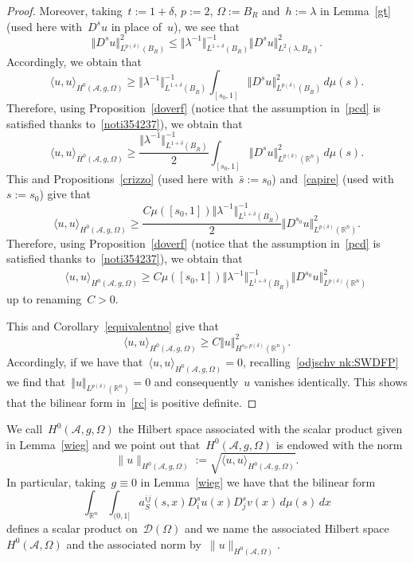 \documentclass[11pt,hyp,]{nyjm}
\numberwithin{equation}{section}
\newcommand{\R}{\mathbb{R}}
\theoremstyle{remark}
\renewcommand{\le}{\leqslant}
\renewcommand{\geq}{\geqslant}
\renewcommand{\ge}{\geqslant}
\begin{document}
\begin{proof}
Moreover, taking~$t:= 1+\delta$, $p:=2$, $\Omega:=B_R$ and~$h:=\lambda$ 
in Lemma~\ref{gt} (used here with~$D^s u $ in place of~$u$), we see that
\begin{equation}\label{pot}
 \Vert D^s u \Vert^2_{L^{p(\delta)}(B_R)}\le \Vert \lambda^{-1}\Vert^{-1}_{L^{1+\delta}(B_R)} \Vert D^s u \Vert_{L^2(\lambda, B_R)}^2.
\end{equation}
Accordingly, we obtain that
$$\langle u, u \rangle_{H^{0}(\mathcal{A}, g, \Omega)}\ge
\Vert \lambda^{-1} \Vert_{L^{1+\delta}(B_{\overline R})}^{-1} \int_{[s_0,1]} \Vert D^s u \Vert^2_{L^{p(\delta)}(B_{\overline R})} \, d\mu(s).$$
Therefore, using Proposition~\ref{doverf}
(notice that the assumption in~\eqref{pcd}
is satisfied thanks to~\eqref{noti354237}), we obtain that
$$\langle u, u \rangle_{H^{0}(\mathcal{A}, g, \Omega)}\ge\frac{
\Vert \lambda^{-1} \Vert_{L^{1+\delta}(B_{\overline R})}^{-1}}2 \int_{[s_0,1]} \Vert D^s u \Vert^2_{L^{p(\delta)}(\R^n)} \, d\mu(s).$$
This and Propositions~\ref{crizzo} (used here with~$\bar s:=s_0$) and~\ref{capire} (used with~$s:=s_0$) give that
$$\langle u, u \rangle_{H^{0}(\mathcal{A}, g, \Omega)}\ge \frac{C \mu([s_0,1])
\Vert \lambda^{-1} \Vert_{L^{1+\delta}(B_{\overline R})}^{-1}}2 \Vert D^{s_0} u \Vert^2_{L^{p(\delta)}(\R^n)}.$$
Therefore, using Proposition~\ref{doverf}
(notice that the assumption in~\eqref{pcd}
is satisfied thanks to~\eqref{noti354237}), we obtain that
\begin{eqnarray*}&&
\langle u, u \rangle_{H^{0}(\mathcal{A}, g, \Omega)}\geq 
C \mu([s_0,1])
\Vert \lambda^{-1} \Vert_{L^{1+\delta}(B_{\overline R})}^{-1} 
  \Vert D^{s_0} u \Vert^2_{L^{p(\delta)}(\R^n)}  
					\end{eqnarray*}
up to renaming~$C>0$.					
					
This and Corollary~\ref{equivalentno} give that			
$$	\langle u, u \rangle_{H^{0}(\mathcal{A}, g, \Omega)}\geq C \Vert u \Vert^2_{H^{s_0, p(\delta)}(\R^n)}.	$$
Accordingly, if we have that~$\langle u, u \rangle_{H^{0}(\mathcal{A}, g, \Omega)}=0$,
recalling~\eqref{odjschv nk:SWDFP}
we find that~$\Vert u \Vert_{L^{p(\delta)}(\R^n)} =0$ and consequently~$u$ vanishes identically.
This shows
that the bilinear form in~\eqref{rc}
is positive definite.
\end{proof}

We call~$H^{0}(\mathcal{A}, g,\Omega)$
the Hilbert space associated with the scalar product given in Lemma~\ref{wieg}
and we point out that~$H^{0}(\mathcal{A}, g,\Omega)$ is endowed with the norm
$$ \| u\|_{H^{0}(\mathcal{A}, g,\Omega)} :=\sqrt{   \langle u, u \rangle_{H^{0}(\mathcal{A}, g, \Omega)}}.$$
In particular, taking~$g \equiv 0$
in Lemma~\ref{wieg} we have that the bilinear form
$$ \int_{\R^n} \int_{(0,1]} a^{ij}_S(s,x) D_i^su(x) D_j^sv(x) \, d\mu(s) \, dx$$
defines a scalar product on~$\mathcal{D}(\Omega)$ and we name the associated Hilbert space $H^{0}(\mathcal{A}, \Omega)$ and the associated norm by~$ \| u\|_{H^{0}(\mathcal{A}, \Omega)}$. 
\end{document}
